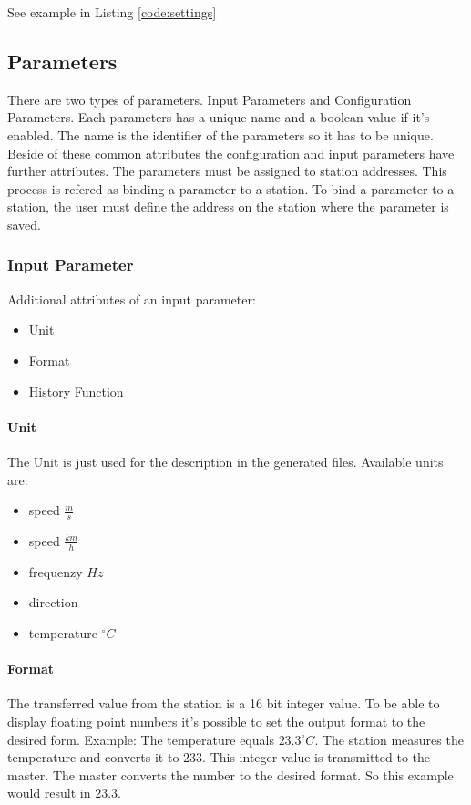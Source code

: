 See example in Listing \ref{code:settings}

{\C  }

\subsection{Parameters} %
\label{sub:parameters}
There are two types of parameters. Input Parameters and Configuration Parameters. Each parameters has a unique name and a boolean value if it's enabled. The name is the identifier of the parameters so it has to be unique. Beside of these common attributes the configuration and input parameters have further attributes. The parameters must be assigned to station addresses. This process is refered as binding a parameter to a station. To bind a parameter to a station, the user must define the address on the station where the parameter is saved.

\subsubsection{Input Parameter} %
\label{ssub:input_parameter}
Additional attributes of an input parameter:
\begin{itemize}
	\item Unit
	\item Format
	\item History Function
\end{itemize}

\paragraph{Unit} %
\label{par:unit}
The Unit is just used for the description in the generated files. Available units are:
\begin{itemize}
	\item speed $\frac{m}{s}$
	\item speed $\frac{km}{h}$
	\item frequenzy $Hz$
	\item direction
	\item temperature $^\circ C$
\end{itemize}


\paragraph{Format} %
\label{par:format}
The transferred value from the station is a 16 bit integer value. To be able to display floating point numbers it's possible to set the output format to the desired form. Example: The temperature equals $23.3 ^\circ C$. The station measures the temperature and converts it to $233$. This integer value is transmitted to the master. The master converts the number to the desired format. So this example would result in $23.3$.

